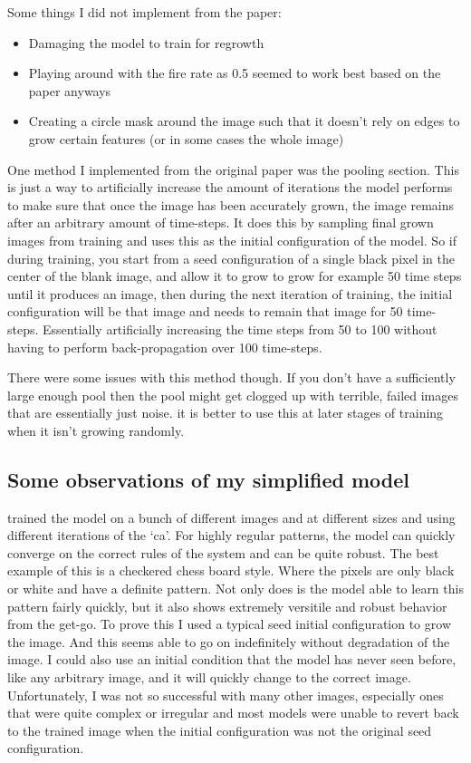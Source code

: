 \documentclass{article}
\begin{document}
	Some things I did not implement from the paper:
	\begin{itemize}
		\item Damaging the model to train for regrowth
		\item Playing around with the fire rate as 0.5 seemed to work best based on the paper anyways
		\item Creating a circle mask around the image such that it doesn't rely on edges to grow certain features (or in some cases the whole image)
	\end{itemize}
	
	One method I implemented from the original paper was the pooling section. This is just a way to artificially increase the amount of iterations the model performs to make sure that once the image has been accurately grown, the image remains after an arbitrary amount of time-steps. It does this by sampling final grown images from training and uses this as the initial configuration of the model. So if during training, you start from a seed configuration of a single black pixel in the center of the blank image, and allow it to grow to grow for example 50 time steps until it produces an image, then during the next iteration of training, the initial configuration will be that image and needs to remain that image for 50 time-steps. Essentially artificially increasing the time steps from 50 to 100 without having to perform back-propagation over 100 time-steps.
	
	There were some issues with this method though. If you don't have a sufficiently large enough pool then the pool might get clogged up with terrible, failed images that are essentially just noise. it is better to use this at later stages of training when it isn't growing randomly.
	
	
\subsection*{Some observations of my simplified model}
	 trained the model on a bunch of different images and at different sizes and using different iterations of the ‘ca’. For highly regular patterns, the model can quickly converge on the correct rules of the system and can be quite robust. The best example of this is a checkered chess board style. Where the pixels are only black or white and have a definite pattern. Not only does is the model able to learn this pattern fairly quickly, but it also shows extremely versitile and robust behavior from the get-go. To prove this I used a typical seed initial configuration to grow the image. And this seems able to go on indefinitely without degradation of the image. I could also use an initial condition that the model has never seen before, like any arbitrary image, and it will quickly change to the correct image. Unfortunately, I was not so successful with many other images, especially ones that were quite complex or irregular and most models were unable to revert back to the trained image when the initial configuration was not the original seed configuration.
\end{document}
